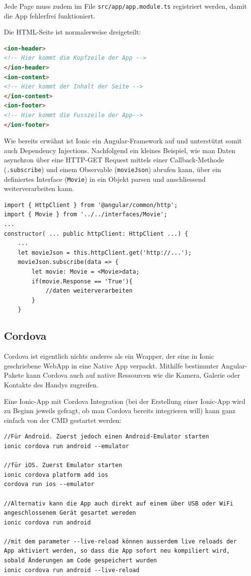 \documentclass[a4paper, 11pt]{article}
\newcommand{\code}[1]{\texttt{#1}}
\begin{document}
\noindent Jede Page muss zudem im File \code{src/app/app.module.ts} registriert werden, damit die App fehlerfrei funktioniert.

Die HTML-Seite ist normalerweise dreigeteilt:

\begin{lstlisting}[language=html]
<ion-header>
<!-- Hier kommt die Kopfzeile der App -->
</ion-header>
<ion-content>
<!-- Hier kommt der Inhalt der Seite -->
</ion-content>
<ion-footer>
<!-- Hier kommt die Fusszeile der App-->
</ion-footer>
\end{lstlisting}

\vspace{10px}
 
\noindent Wie bereits erwähnt ist Ionic ein Angular-Framework auf und unterstützt somit auch Dependency Injections. Nachfolgend ein kleines Beispiel, wie man Daten asynchron über eine HTTP-GET Request mittels einer Callback-Methode (\code{.subscribe}) und einem Observable (\code{movieJson}) abrufen kann, über ein definiertes Interface (\code{Movie}) in ein Objekt parsen und anschliessend weiterverarbeiten kann.

\begin{lstlisting}
import { HttpClient } from '@angular/common/http'; 
import { Movie } from '../../interfaces/Movie';
... 
constructor( ... public httpClient: HttpClient ...) { 
	... 
	let movieJson = this.httpClient.get('http://...');
	movieJson.subscribe(data => { 
		let movie: Movie = <Movie>data;
		if(movie.Response == 'True'){
			//daten weiterverarbeiten
		}
	}
\end{lstlisting}

\subsection{Cordova}
Cordova ist eigentlich nichts anderes als ein Wrapper, der eine in Ionic geschriebene WebApp in eine Native App verpackt. Mithilfe bestimmter Angular-Pakete kann Cordova auch auf native Ressourcen wie die Kamera, Galerie oder Kontakte des Handys zugreifen.
\vspace{10px}

\noindent Eine Ionic-App mit Cordova Integration (bei der Erstellung einer Ionic-App wird zu Beginn jeweils gefragt, ob man Cordova bereits integrieren will) kann ganz einfach von der CMD gestartet werden:

\begin{lstlisting}
//Für Android. Zuerst jedoch einen Android-Emulator starten
ionic cordova run android --emulator

//für iOS. Zuerst Emulator starten
ionic cordova platform add ios
cordova run ios --emulator

//Alternativ kann die App auch direkt auf einem über USB oder WiFi angeschlossenem Gerät gesartet wereden
ionic cordova run android

//mit dem parameter --live-reload können ausserdem live reloads der App aktiviert werden, so dass die App sofort neu kompiliert wird, sobald Änderungen am Code gespeichert wurden
ionic cordova run android --live-reload
\end{lstlisting}
\end{document}

